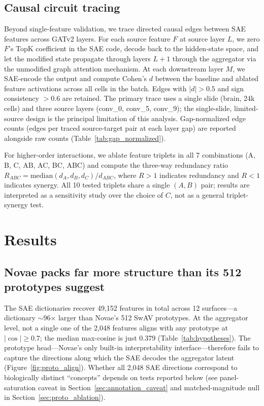\documentclass[11pt]{article}
\begin{document}
\subsection{Causal circuit tracing}
\label{sec:methods_circuits}

Beyond single-feature validation, we trace directed causal edges
between SAE features across GATv2 layers. For each source feature $F$
at source layer $L$, we zero $F$'s TopK coefficient in the SAE code,
decode back to the hidden-state space, and let the modified state
propagate through layers $L{+}1$ through the aggregator via the
unmodified graph attention mechanism. At each downstream layer $M$,
we SAE-encode the output and compute Cohen's $d$ between the baseline
and ablated feature activations across all cells in the batch. Edges
with $|d| > 0.5$ and sign consistency $> 0.6$ are retained. The
primary trace uses a single slide (brain, 24k cells) and three source
layers (conv\_0, conv\_5, conv\_9); the single-slide, limited-source
design is the principal limitation of this analysis. Gap-normalized
edge counts (edges per traced source-target pair at each layer gap)
are reported alongside raw counts (Table~\ref{tab:gap_normalized}).

For higher-order interactions, we ablate feature triplets in all 7
combinations (A, B, C, AB, AC, BC, ABC) and compute the three-way
redundancy ratio $R_{ABC} = \text{median}(d_A, d_B, d_C) / d_{ABC}$,
where $R > 1$ indicates redundancy and $R < 1$ indicates synergy. All
10 tested triplets share a single $(A, B)$ pair; results are
interpreted as a sensitivity study over the choice of $C$, not as a
general triplet-synergy test.

\section{Results}

\subsection{Novae packs far more structure than its 512 prototypes suggest}

The SAE dictionaries recover 49{,}152 features in total across 12
surfaces---a dictionary $\sim$96$\times$ larger than Novae's 512 SwAV
prototypes. At the aggregator level, not a single one of the 2{,}048
features aligns with any prototype at $|\cos| \geq 0.7$; the median
max-cosine is just 0.379 (Table~\ref{tab:hypotheses}). The prototype
head---Novae's only built-in interpretability interface---therefore
fails to capture the directions along which the SAE decodes the
aggregator latent (Figure~\ref{fig:proto_align}). Whether all 2{,}048
SAE directions correspond to biologically distinct ``concepts''
depends on tests reported below (see panel-saturation caveat in
Section~\ref{sec:annotation_caveat} and matched-magnitude null in
Section~\ref{sec:proto_ablation}).
\end{document}

